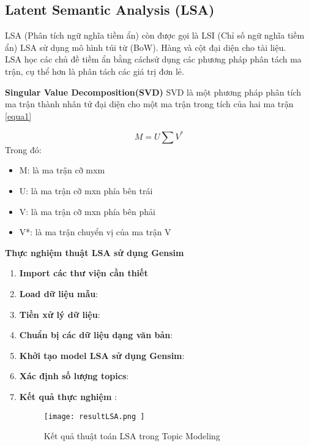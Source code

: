 \subsection{Latent Semantic Analysis (LSA)}

LSA (Phân tích ngữ nghĩa tiềm ẩn) còn được gọi là LSI (Chỉ số ngữ nghĩa tiềm ẩn) LSA sử dụng mô hình túi từ (BoW). 
Hàng và cột đại diện cho tài liệu. \\
LSA học các chủ đề tiềm ẩn bằng cáchsử dụng các phương pháp phân tách ma trận, cụ thể hơn là phân tách các giá trị đơn lẻ.

\textbf{Singular Value Decomposition(SVD)}
SVD là một phương pháp phân tích ma trận thành nhân tử đại diện cho một ma trận trong tích của hai ma trận \ref{equa1} \cite{WEBSITE:13}

\begin{equation}
	M=U \sum V^* \label{equa1}
\end{equation}
Trong đó:
\begin{itemize}
	\item M: là ma trận cỡ mxm\\
	\item U: là ma trận cỡ mxn phía bên trái\\
	\item V: là ma trận cỡ mxn phía bên phải\\
	\item V*: là ma trận chuyển vị của ma trận V\\
\end{itemize}

\textbf{Thực nghiệm thuật LSA sử dụng Gensim} \cite{WEBSITE:13}
\begin{enumerate}
	\item \textbf{Import các thư viện cần thiết}
		
	\item \textbf{Load dữ liệu mẫu}:
		
	
	\item \textbf{Tiền xử lý dữ liệu}:
		
		
	\item \textbf{Chuẩn bị các dữ liệu dạng văn bản}:
		
		
	\item \textbf{Khởi tạo model LSA sử dụng Gensim}:
		
		
	\item \textbf{Xác định số lượng topics}: 
		
	\item \textbf{Kết quả thực nghiệm} :
		
		\begin{figure}[h!]
			\centering
			\texttt{[image: 
				resultLSA.png
			]}
			\caption[Kết quả thuật toán LSA trong Topic Modeling]{
				Kết quả thuật toán LSA trong Topic Modeling 
			}
		\end{figure}
\end{enumerate}


